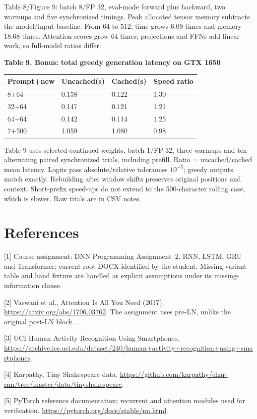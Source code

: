 \documentclass[11pt,a4paper]{article}
\begin{document}
Table 8/Figure 9: batch 8/FP 32, eval-mode forward plus backward, two warmups and five synchronized timings. Peak allocated tensor memory subtracts the model/input baseline. From 64 to 512, time grows 6.09 times and memory 18.68 times. Attention scores grow 64 times; projections and FFNs add linear work, so full-model ratios differ.
\begin{center}\textbf{Table 9. Bonus: total greedy generation latency on GTX 1650}\par\smallskip
\begin{tabular}{llll}\toprule
Prompt+new & Uncached(s) & Cached(s) & Speed ratio\\\midrule
8+64 & 0.158 & 0.122 & 1.30\\
32+64 & 0.147 & 0.121 & 1.21\\
64+64 & 0.142 & 0.114 & 1.25\\
7+500 & 1.059 & 1.080 & 0.98\\
\bottomrule\end{tabular}\end{center}
Table 9 uses selected continued weights, batch 1/FP 32, three warmups and ten alternating paired synchronized trials, including prefill. Ratio = uncached/cached mean latency. Logits pass absolute/relative tolerances $10^{-5}$; greedy outputs match exactly. Rebuilding after window shifts preserves original positions and context. Short-prefix speed-ups do not extend to the 500-character rolling case, which is slower. Raw trials are in CSV notes.
\newpage
\section*{References}

[1] Course assignment: DNN Programming Assignment--2, RNN, LSTM, GRU and Transformer;
current root DOCX identified by the student. Missing variant table and hand fixture
are handled as explicit assumptions under its missing-information clause.

[2] Vaswani et al., Attention Is All You Need (2017).
\url{https://arxiv.org/abs/1706.03762}. The assignment uses pre-LN, unlike the original post-LN block.

[3] UCI Human Activity Recognition Using Smartphones.
\url{https://archive.ics.uci.edu/dataset/240/human+activity+recognition+using+smartphones}.

[4] Karpathy, Tiny Shakespeare data.
\url{https://github.com/karpathy/char-rnn/tree/master/data/tinyshakespeare}.

[5] PyTorch reference documentation; recurrent and attention modules used for verification.
\url{https://pytorch.org/docs/stable/nn.html}.
\end{document}
